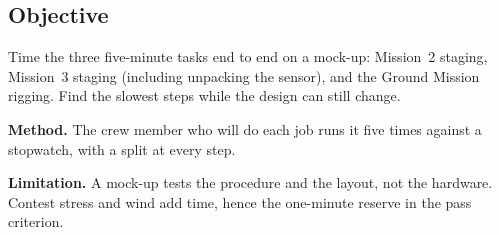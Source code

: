 \documentclass[final]{dbfdoc}
\begin{document}
\begin{frontmatter}
\section{Objective}
\noindent\begin{minipage}[t]{0.62\textwidth}
\setlength\parindent{1.15em}\noindent
Time the three five-minute tasks end to end on a mock-up: Mission~2 staging, Mission~3 staging (including unpacking the sensor), and the Ground Mission rigging. Find the slowest steps while the design can still change.

\noindent\textbf{Method.} The crew member who will do each job runs it five times against a stopwatch, with a split at every step.

\noindent\textbf{Limitation.} A mock-up tests the procedure and the layout, not the hardware. Contest stress and wind add time, hence the one-minute reserve in the pass criterion.
\end{minipage}\hfill
\begin{minipage}[t]{0.35\textwidth}
\vspace{-11pt}
\begin{dbfpanel}
\hfill{}\dbfreadoutgap
{}\hfill{}\dbfreadoutgap
{}\hfill{}
\end{dbfpanel}
\end{minipage}
\end{frontmatter}
\end{document}
